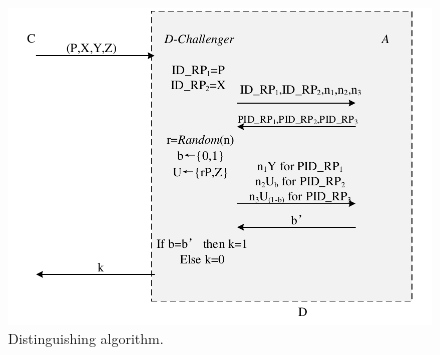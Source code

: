 \begin{figure}[t]
  \centering
  \includegraphics[width=1\linewidth]{fig/dalgorithm.pdf}
  \caption{Distinguishing algorithm.}
  \label{fig:dalgorithm}
\end{figure}